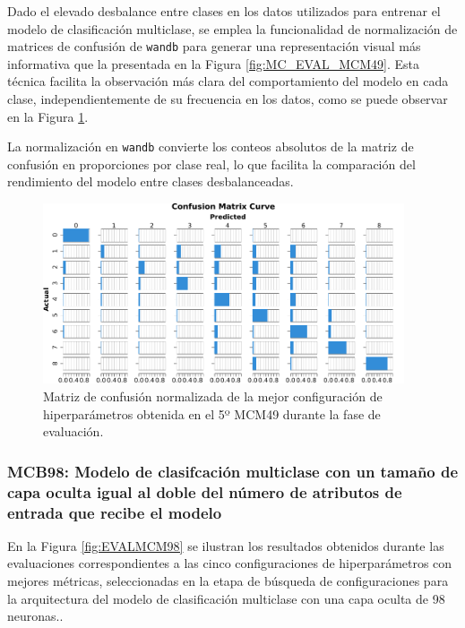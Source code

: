 Dado el elevado desbalance entre clases en los datos utilizados para entrenar el modelo de clasificación multiclase, se emplea la funcionalidad de normalización de matrices de confusión de \texttt{wandb} para generar una representación visual más informativa que la presentada en la Figura \ref{fig:MC_EVAL_MCM49}. Esta técnica facilita la observación más clara del comportamiento del modelo en cada clase, independientemente de su frecuencia en los datos, como se puede observar en la Figura \ref{fig:MCNorm_EVAL_MCM49}.

La normalización en \texttt{wandb} convierte los conteos absolutos de la matriz de confusión en proporciones por clase real, lo que facilita la comparación del rendimiento del modelo entre clases desbalanceadas.

\begin{figure}[H]
    \centering
    \includegraphics[width=0.95\textwidth]{./img/evaluacion/matrices_confusion/MCNorm_EVAL_MCM49.pdf}
    \caption{Matriz de confusión normalizada de la mejor configuración de hiperparámetros obtenida en el 5º MCM49 durante la fase de evaluación.}
    \label{fig:MCNorm_EVAL_MCM49}
\end{figure}




\subsubsection{MCB98: Modelo de clasifcación multiclase con un tamaño de capa oculta igual al doble del número de atributos de entrada que recibe el modelo}
En la Figura \ref{fig:EVALMCM98} se ilustran los resultados obtenidos durante las evaluaciones correspondientes a las cinco configuraciones de hiperparámetros con mejores métricas, seleccionadas en la etapa de búsqueda de configuraciones para la arquitectura del modelo de clasificación multiclase con una capa oculta de 98 neuronas..

